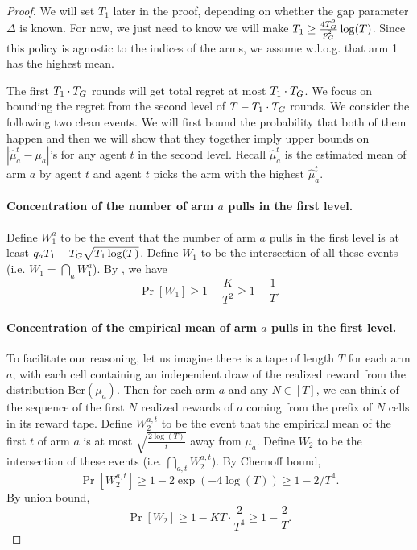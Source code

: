 





\begin{proof}
  We will set $T_1$ later in the proof, depending on whether the gap
  parameter $\Delta$ is known. For now, we just need to know we will
  make $T_1 \geq \frac{4T_G^2}{p_G^2}\log(T)$. Since this policy is
  agnostic to the indices of the arms, we assume w.l.o.g. that arm 1
  has the highest mean.

  The first $T_1 \cdot T_G$ rounds will get total regret at most
  $T_1 \cdot T_G$.  We focus on bounding the regret from the second
  level of $T - T_1 \cdot T_G$ rounds. We consider the following two
  clean events. We will first bound the probability that both of them
  happen and then we will show that they together imply upper bounds
  on $|\hat{\mu}^t_a - \mu_a|$'s for any agent $t$ in the second
  level. Recall $\hat{\mu}^t_a$ is the estimated mean of arm $a$ by
  agent $t$ and agent $t$ picks the arm with the highest
  $\hat{\mu}^t_a$.

  \paragraph{Concentration of the number of arm $a$ pulls in the first
    level.}
  Define $W_1^a$ to be the event that the number of arm $a$ pulls in
  the first level is at least $q_a T_1- T_G \sqrt{T_1\log(T)}$.
Define $W_1$ to be the intersection of all these events (i.e. $W_1 = \bigcap_{a}W_1^a$). By , we have
\[
\Pr[W_1] \geq 1- \frac{K}{T^2} \geq 1 - \frac{1}{T}.
\]
\paragraph{Concentration of the empirical mean of arm $a$ pulls in the first level.}
To facilitate our reasoning, let us imagine there is a tape of length
$T$ for each arm $a$, with each cell containing an independent draw of
the realized reward from the distribution Ber$(\mu_a)$. Then for each
arm $a$ and any $N\in [T]$, we can think of the sequence of the first
$N$ realized rewards of $a$ coming from the prefix of $N$ cells in its
reward tape. Define $W^{a,t}_2$ to be the event that the empirical
mean of the first $t$  of arm $a$
is at most $\sqrt{\frac{2\log(T)}{t}}$ away from $\mu_a$. Define $W_2$
to be the intersection of these events (i.e.
$\bigcap_{a,t} W^{a,t}_2$).  By Chernoff bound,
\[
\Pr[W^{a,t}_2] \geq 1 - 2\exp(-4\log(T)) \geq 1-2/T^4.
\]
By union bound, 
\[
\Pr[W_2] \geq 1 - KT \cdot \frac{2}{T^4} \geq 1 - \frac{2}{T}.
\]




\end{proof}
